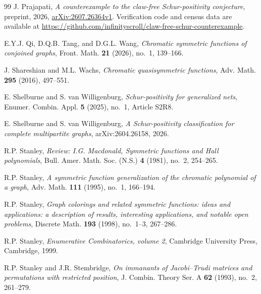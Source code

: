 \documentclass[11pt]{amsart}
\numberwithin{equation}{section}
\theoremstyle{remark}
\begin{document}
\begin{thebibliography}{99}
\label{ref:Prajapati2026}
J. Prajapati,
\emph{A counterexample to the claw-free Schur-positivity conjecture},
preprint, 2026,
\href{https://arxiv.org/abs/2607.26364}{arXiv:2607.26364v1}.
Verification code and census data are available at
\url{https://github.com/infinityscroll/claw-free-schur-counterexample}.

\label{ref:QTW26} E.Y.J. Qi, D.Q.B. Tang, and D.G.L. Wang, \emph{Chromatic symmetric functions of conjoined graphs}, Front. Math. \textbf{21} (2026), no.~1, 139--166.

\label{ref:ShareshianWachs2016} J. Shareshian and M.L. Wachs, \emph{Chromatic quasisymmetric functions}, Adv. Math. \textbf{295} (2016), 497--551.

\label{ref:ShelburneVanWilligenburg2025} E. Shelburne and S. van Willigenburg, \emph{Schur-positivity for generalized nets}, Enumer. Combin. Appl. \textbf{5} (2025), no.~1, Article S2R8.

\label{ref:ShelburneVanWilligenburg2026} E. Shelburne and S. van Willigenburg, \emph{A Schur-positivity classification for complete multipartite graphs}, arXiv:2604.26158, 2026.

\label{ref:Stanley1981} R.P. Stanley, \emph{Review: I.G. Macdonald, Symmetric functions and Hall polynomials}, Bull. Amer. Math. Soc. (N.S.) \textbf{4} (1981), no.~2, 254--265.

\label{ref:Stanley1995} R.P. Stanley, \emph{A symmetric function generalization of the chromatic polynomial of a graph}, Adv. Math. \textbf{111} (1995), no.~1, 166--194.

\label{ref:Stanley1998} R.P. Stanley, \emph{Graph colorings and related symmetric functions: ideas and applications: a description of results, interesting applications, and notable open problems}, Discrete Math. \textbf{193} (1998), no.~1--3, 267--286.

\label{ref:Stanley1999} R.P. Stanley, \emph{Enumerative Combinatorics, volume 2}, Cambridge University Press, Cambridge, 1999.

\label{ref:StanleyStembridge1993} R.P. Stanley and J.R. Stembridge, \emph{On immanants of Jacobi--Trudi matrices and permutations with restricted position}, J. Combin. Theory Ser. A \textbf{62} (1993), no.~2, 261--279.


\end{thebibliography}
\end{document}
